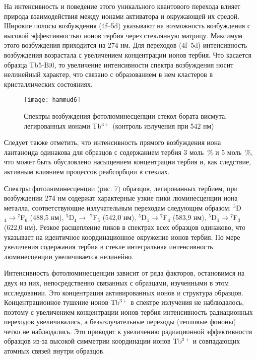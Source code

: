 \documentclass[press]{vestnik}
\begin{document}
На интенсивность и поведение этого уникального квантового перехода влияет 
природа взаимодействия между ионами активатора и окружающей их средой. 
Широкие полосы возбуждения (4f--5d) указывают на возможность возбуждения с 
высокой эффективностью ионов тербия через стеклянную матрицу. Максимум этого 
возбуждения приходится на 274 нм. Для переходов (4f--5d) интенсивность 
возбуждения возрастала с увеличением концентрации ионов тербия. Что касается 
образца Tb5-Bi0, то увеличение интенсивности спектра возбуждения носит 
нелинейный характер, что связано с образованием в нем кластеров в 
кристаллических состояниях.

\begin{figure}
\centerline{\texttt{[image: hammud6]}}
\caption{Спектры возбуждения фотолюминесценции стекол бората висмута, 
легированных ионами Tb$^{3+}$ (контроль излучения при 542 нм)}
\label{fig6}
\end{figure}

Следует также отметить, что интенсивность прямого возбуждения иона 
лантаноида одинакова для образцов с содержанием тербия 3 моль~{\%} и 5 
моль~{\%}, что может быть обусловлено насыщением концентрации тербия и, как 
следствие, активным влиянием процессов реабсорбции в стеклах.

Спектры фотолюминесценции (рис. 7) образцов, легированных тербием, при 
возбуждении 274 нм содержат характерные узкие пики люминесценции иона 
металла, соответствующие излучательным переходам следующим образом: 
$^{5}$D$_{4} \to {}^{7}$F$_{6}$ (488,5 нм), $^{5}$D$_{4} \to $ 
$^{7}$F$_{5}$ (542,0 нм), $^{5}$D$_{4} \to {}^{7}$F$_{4}$ (583,9 нм), 
$^{5}$D$_{4} \to {}^{7}$F$_{3}$ (622,0 нм). Резкое расщепление пиков в 
спектрах всех образцов одинаково, что указывает на идентичное 
координационное окружение ионов тербия. По мере увеличения содержания тербия 
в стекле интегральная интенсивность люминесценции увеличивается нелинейно.

Интенсивность фотолюминесценции зависит от ряда факторов, остановимся на 
двух из них, непосредственно связанных с образцами, изученными в этом 
исследовании. Это концентрация активированных ионов и структура образцов. 
Концентрационное тушение ионов Tb$^{3+}$ в спектре излучения не наблюдалось, 
поэтому с увеличением концентрации ионов тербия интенсивность радиационных 
переходов увеличивались, а безызлучательные переходы (тепловые фононы) четко 
не наблюдались. Это приводит к увеличению радиационной эффективности 
образцов из-за высокой симметрии координации ионов Tb$^{3+}$ и совпадающих 
атомных связей внутри образцов.
\end{document}
